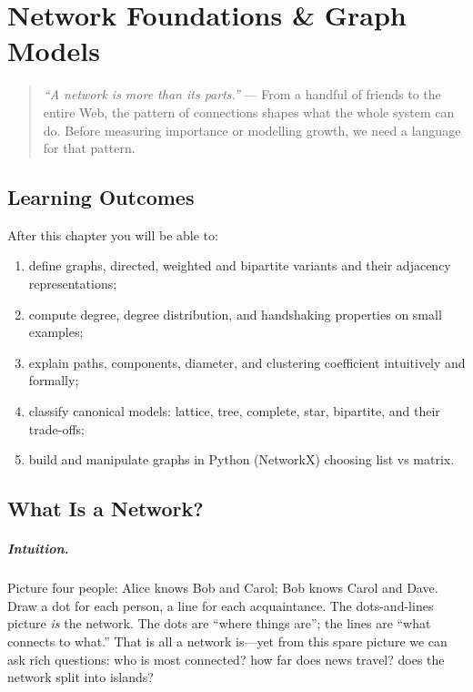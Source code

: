 \chapter{Network Foundations \& Graph Models}
\label{ch:foundations}
\sloppy

\begin{quote}
\emph{``A network is more than its parts.''} --- From a handful of friends to the entire Web, the pattern of connections shapes what the whole system can do. Before measuring importance or modelling growth, we need a language for that pattern.
\end{quote}

\noindent{}
\vspace{0.4em}

\section*{Learning Outcomes}
After this chapter you will be able to:
\begin{enumerate}[label=(L\arabic*)]
    \item define graphs, directed, weighted and bipartite variants and their adjacency representations;
    \item compute degree, degree distribution, and handshaking properties on small examples;
    \item explain paths, components, diameter, and clustering coefficient intuitively and formally;
    \item classify canonical models: lattice, tree, complete, star, bipartite, and their trade-offs;
    \item build and manipulate graphs in Python (NetworkX) choosing list vs matrix.
\end{enumerate}

\section{What Is a Network?}
\label{sec:what-is-network}
\paragraph{Intuition.} Picture four people: Alice knows Bob and Carol; Bob knows Carol and Dave. Draw a dot for each person, a line for each acquaintance. The dots-and-lines picture \emph{is} the network. The dots are ``where things are''; the lines are ``what connects to what.'' That is all a network is---yet from this spare picture we can ask rich questions: who is most connected? how far does news travel? does the network split into islands?


